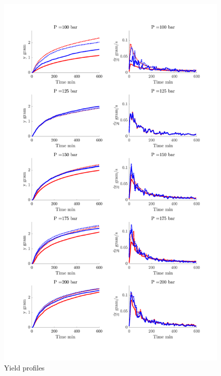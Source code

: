 \documentclass[../Article_Sensitivity_Analsysis.tex]{subfiles}
\begin{document}
	\begin{figure}[h!]
		\centering
		\includegraphics[trim= 2.5cm 2.5cm 2.2cm 2.5cm, clip, width=\columnwidth]{Figures/Results/Profiles_Y.png}	
		\caption{Yield profiles}
		\label{fig:Porfiles_Y}
	\end{figure}
	
\end{document}
